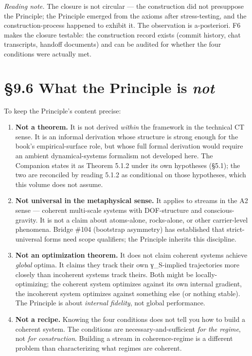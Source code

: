 \documentclass[11pt, openany]{book}
\newcommand{\sectionbreak}{\clearpage}
\begin{document}
\textit{Reading note.} The closure is not circular --- the construction did not presuppose the Principle; the Principle emerged from the axioms after stress-testing, and the construction-process happened to exhibit it. The observation is a-posteriori. F6 makes the closure testable: the construction record exists (commit history, chat transcripts, handoff documents) and can be audited for whether the four conditions were actually met.

\sectionbreak

\section{§9.6 What the Principle is \textit{not}}

To keep the Principle's content precise:

\begin{enumerate}
\item \textbf{Not a theorem.} It is not derived \textit{within} the framework in the technical CT sense. It is an informal derivation whose structure is strong enough for the book's empirical-surface role, but whose full formal derivation would require an ambient dynamical-systems formalism not developed here. The Companion states it as Theorem 5.1.2 under its own hypotheses (§5.1); the two are reconciled by reading 5.1.2 as conditional on those hypotheses, which this volume does not assume.

\item \textbf{Not universal in the metaphysical sense.} It applies to streams in the A2 sense --- coherent multi-scale systems with DOF-structure and conscious-gravity. It is not a claim about atoms-alone, rocks-alone, or other carrier-level phenomena. Bridge \#104 (bootstrap asymmetry) has established that strict-universal forms need scope qualifiers; the Principle inherits this discipline.

\item \textbf{Not an optimization theorem.} It does not claim coherent systems achieve \textit{global} optima. It claims they track their own γ\_\allowbreak{}S-implied trajectories more closely than incoherent systems track theirs. Both might be locally-optimizing; the coherent system optimizes against its own internal gradient, the incoherent system optimizes against something else (or nothing stable). The Principle is about \textit{internal fidelity}, not global performance.

\item \textbf{Not a recipe.} Knowing the four conditions does not tell you how to build a coherent system. The conditions are necessary-and-sufficient \textit{for the regime}, not \textit{for construction}. Building a stream in coherence-regime is a different problem than characterizing what regimes are coherent.
\end{enumerate}
\end{document}
